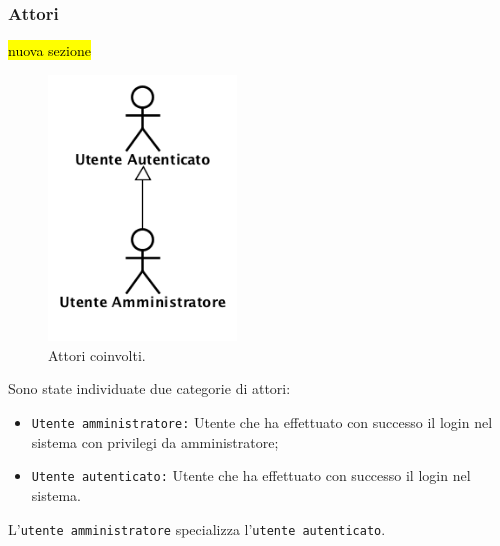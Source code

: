 	\subsubsection{Attori}
	\hl{nuova sezione}
	\begin{figure}[H]
		\begin{center}
			\includegraphics[width=5cm]{Pics/Attori.png}
			\caption{Attori coinvolti.}
			\label{fig:DiagrammaAttori}
		\end{center}
	\end{figure}	
	Sono state individuate due categorie di attori: 
	\begin{itemize}
		\item \texttt{Utente amministratore:} Utente che ha effettuato con successo il login nel sistema con privilegi da amministratore;
		\item \texttt{Utente autenticato:} Utente che ha effettuato con successo il login nel sistema.
	\end{itemize}
	
	L'\texttt{utente amministratore} specializza l'\texttt{utente autenticato}.
	
	\newpage
